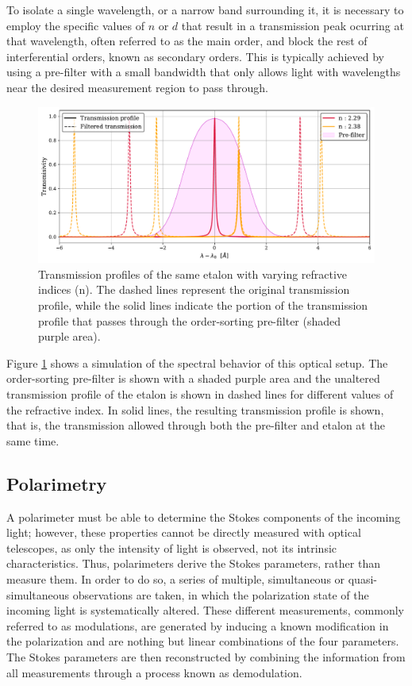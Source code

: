 To isolate a single wavelength, or a narrow band surrounding it, it is necessary to employ the specific values of $n$ or $d$ that result in a transmission peak ocurring at that wavelength, often referred to as the main order, and block the rest of interferential orders, known as secondary orders. This is typically achieved by using a pre-filter with a small bandwidth that only allows light with wavelengths near the desired measurement region to pass through. 

\begin{figure}
  \centering
  \includegraphics[width = \textwidth]{figures/Introduction_to_spectropolarimeters/Etalon_and_prefilter_example.pdf}
  \caption[Etalon's transmission profiles and prefilter.]{Transmission profiles of the same etalon with varying refractive indices (n). The dashed lines represent the original transmission profile, while the solid lines indicate the portion of the transmission profile that passes through the order-sorting pre-filter (shaded purple area).} 
  \label{fig_ch2: etalon_example}
\end{figure}

Figure \ref{fig_ch2: etalon_example} shows a simulation of the spectral behavior of this optical setup. The order-sorting pre-filter is shown with a shaded purple area and the unaltered transmission profile of the etalon is shown in dashed lines for different values of the refractive index. In solid lines, the resulting transmission profile is shown, that is, the transmission allowed through both the pre-filter and etalon at the same time. 

\subsection{Polarimetry}

A polarimeter must be able to determine the Stokes components of the incoming light; however, these properties cannot be directly measured with optical telescopes, as only the intensity of light is observed, not its intrinsic characteristics. Thus, polarimeters derive the Stokes parameters, rather than measure them. In order to do so, a series of multiple, simultaneous or quasi-simultaneous observations are taken, in which the polarization state of the incoming light is systematically altered. These different measurements, commonly referred to as modulations, are generated by inducing a known modification in the polarization and are nothing but linear combinations of the four parameters. The Stokes parameters are then reconstructed by combining the information from all measurements through a process known as demodulation.

